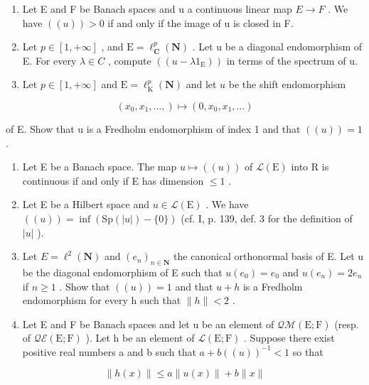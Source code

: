 \exercisesection{}

\begin{enumerate}
\def\labelenumi{\arabic{enumi})}
\item
  Let E and F be Banach spaces and u a continuous linear map \(E \rightarrow F\) . We have \(((u)) > 0\) if and only if the image of u is closed in F.
\item
  Let \(p \in [1, +\infty]\) , and \(\mathrm{E} = \ell_{\mathbf{C}}^{p}(\mathbf{N})\) . Let u be a diagonal endomorphism of E. For every \(\lambda \in C\) , compute \(((u - \lambda 1_{\mathrm{E}}))\) in terms of the spectrum of u.
\item
  Let \(p \in [1, +\infty]\) and \(\mathrm{E} = \ell_{\mathrm{K}}^{p}(\mathbf{N})\) and let \(u\) be the shift endomorphism
\end{enumerate}

\[
(x _ {0}, x _ {1}, \dots ,) \mapsto (0, x _ {0}, x _ {1}, \dots)
\]

of E. Show that u is a Fredholm endomorphism of index 1 and that \(((u)) = 1\) .

\begin{enumerate}
\def\labelenumi{\arabic{enumi})}
\setcounter{enumi}{3}
\item
  Let E be a Banach space. The map \(u \mapsto ((u))\) of \(\mathcal{L}(\mathrm{E})\) into R is continuous if and only if E has dimension \(\leqslant 1\) .
\item
  Let E be a Hilbert space and \(u \in \mathcal{L}(\mathrm{E})\) . We have \(((u)) = \inf(\mathrm{Sp}(|u|) - \{0\})\) (cf. I, p. 139, def. 3 for the definition of \(|u|\) ).
\item
  Let \(E = \ell^{2}(\mathbf{N})\) and \((e_{n})_{n \in \mathbf{N}}\) the canonical orthonormal basis of E. Let u be the diagonal endomorphism of E such that \(u(e_{0}) = e_{0}\) and \(u(e_{n}) = 2e_{n}\) if \(n \geqslant 1\) . Show that \(((u)) = 1\) and that \(u + h\) is a Fredholm endomorphism for every h such that \(\|h\| < 2\) .
\item
  Let E and F be Banach spaces and let u be an element of \(\mathcal{Q}\mathcal{M}(\mathrm{E};\mathrm{F})\) (resp. of \(\mathcal{Q}\mathcal{E}(\mathrm{E};\mathrm{F})\) ). Let h be an element of \(\mathcal{L}(\mathrm{E};\mathrm{F})\) . Suppose there exist positive real numbers a and b such that \(a + b((u))^{-1} < 1\) so that
\end{enumerate}

\[
\| h (x) \| \leqslant a \| u (x) \| + b \| x \|\tag{2}
\]

